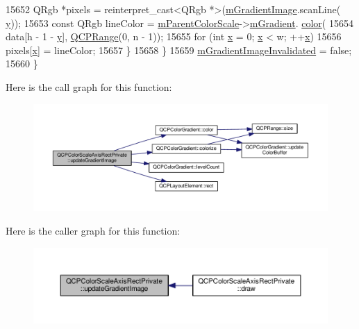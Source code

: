 \begin{DoxyCode}
15652       QRgb *pixels = \textcolor{keyword}{reinterpret\_cast<}QRgb *\textcolor{keyword}{>}(\hyperlink{class_q_c_p_color_scale_axis_rect_private_ad4f7c8ee1c6012d9950870811773119c}{mGradientImage}.scanLine(
      \hyperlink{_comparision_pictures_2_createtest_image_8m_a2fb1c5cf58867b5bbc9a1b145a86f3a0}{y}));
15653       \textcolor{keyword}{const} QRgb lineColor = \hyperlink{class_q_c_p_color_scale_axis_rect_private_a311c73f51a4cb0b556388197833cf099}{mParentColorScale}->\hyperlink{class_q_c_p_color_scale_ae195a385032066b5c46cc3301af58922}{mGradient}.
      \hyperlink{class_q_c_p_color_gradient_a0599545c859268b025d2060dea741cea}{color}(
15654           data[h - 1 - \hyperlink{_comparision_pictures_2_createtest_image_8m_a2fb1c5cf58867b5bbc9a1b145a86f3a0}{y}], \hyperlink{class_q_c_p_range}{QCPRange}(0, n - 1));
15655       \textcolor{keywordflow}{for} (\textcolor{keywordtype}{int} \hyperlink{_comparision_pictures_2_createtest_image_8m_a9336ebf25087d91c818ee6e9ec29f8c1}{x} = 0; \hyperlink{_comparision_pictures_2_createtest_image_8m_a9336ebf25087d91c818ee6e9ec29f8c1}{x} < w; ++\hyperlink{_comparision_pictures_2_createtest_image_8m_a9336ebf25087d91c818ee6e9ec29f8c1}{x})
15656         pixels[\hyperlink{_comparision_pictures_2_createtest_image_8m_a9336ebf25087d91c818ee6e9ec29f8c1}{x}] = lineColor;
15657     \}
15658   \}
15659   \hyperlink{class_q_c_p_color_scale_axis_rect_private_a2c0b15b071e1f93006b48b5be022a631}{mGradientImageInvalidated} = \textcolor{keyword}{false};
15660 \}
\end{DoxyCode}


Here is the call graph for this function\+:\nopagebreak
\begin{figure}[H]
\begin{center}
\leavevmode
\includegraphics[width=350pt]{class_q_c_p_color_scale_axis_rect_private_a73754cab312aeaddea1bfcc67cc079ac_cgraph}
\end{center}
\end{figure}




Here is the caller graph for this function\+:\nopagebreak
\begin{figure}[H]
\begin{center}
\leavevmode
\includegraphics[width=350pt]{class_q_c_p_color_scale_axis_rect_private_a73754cab312aeaddea1bfcc67cc079ac_icgraph}
\end{center}
\end{figure}




